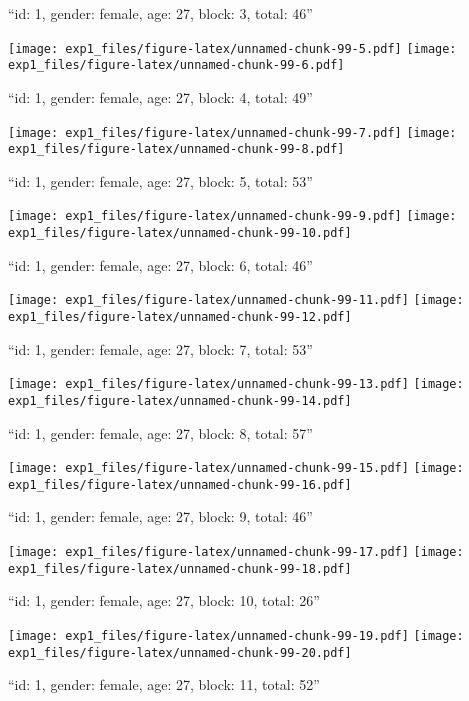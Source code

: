 \documentclass[,]{article}
\begin{document}
``id: 1, gender: female, age: 27, block: 3, total: 46''

\texttt{[image: exp1\_files/figure-latex/unnamed-chunk-99-5.pdf]}
\texttt{[image: exp1\_files/figure-latex/unnamed-chunk-99-6.pdf]}

\newpage
[1] 

``id: 1, gender: female, age: 27, block: 4, total: 49''

\texttt{[image: exp1\_files/figure-latex/unnamed-chunk-99-7.pdf]}
\texttt{[image: exp1\_files/figure-latex/unnamed-chunk-99-8.pdf]}

\newpage
[1] 

``id: 1, gender: female, age: 27, block: 5, total: 53''

\texttt{[image: exp1\_files/figure-latex/unnamed-chunk-99-9.pdf]}
\texttt{[image: exp1\_files/figure-latex/unnamed-chunk-99-10.pdf]}

\newpage
[1] 

``id: 1, gender: female, age: 27, block: 6, total: 46''

\texttt{[image: exp1\_files/figure-latex/unnamed-chunk-99-11.pdf]}
\texttt{[image: exp1\_files/figure-latex/unnamed-chunk-99-12.pdf]}

\newpage
[1] 

``id: 1, gender: female, age: 27, block: 7, total: 53''

\texttt{[image: exp1\_files/figure-latex/unnamed-chunk-99-13.pdf]}
\texttt{[image: exp1\_files/figure-latex/unnamed-chunk-99-14.pdf]}

\newpage
[1] 

``id: 1, gender: female, age: 27, block: 8, total: 57''

\texttt{[image: exp1\_files/figure-latex/unnamed-chunk-99-15.pdf]}
\texttt{[image: exp1\_files/figure-latex/unnamed-chunk-99-16.pdf]}

\newpage
[1] 

``id: 1, gender: female, age: 27, block: 9, total: 46''

\texttt{[image: exp1\_files/figure-latex/unnamed-chunk-99-17.pdf]}
\texttt{[image: exp1\_files/figure-latex/unnamed-chunk-99-18.pdf]}

\newpage
[1] 

``id: 1, gender: female, age: 27, block: 10, total: 26''

\texttt{[image: exp1\_files/figure-latex/unnamed-chunk-99-19.pdf]}
\texttt{[image: exp1\_files/figure-latex/unnamed-chunk-99-20.pdf]}

\newpage
[1] 

``id: 1, gender: female, age: 27, block: 11, total: 52''
\end{document}
